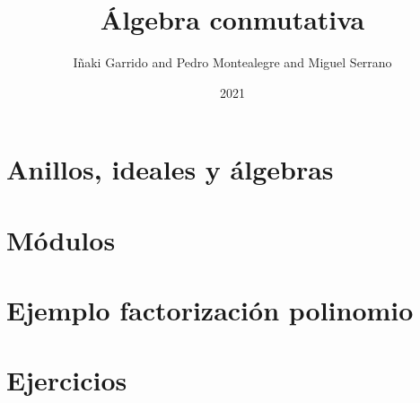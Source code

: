 \documentclass[a4paper,12pt]{book}
\title{Álgebra conmutativa}
\author{Iñaki Garrido and Pedro Montealegre and Miguel Serrano}
\date{2021}
\theoremstyle{definition}
\begin{document}
\maketitle
\chapter{Anillos, ideales y álgebras}

\chapter{Módulos}



\appendix
\chapter{Ejemplo factorización polinomio}

\chapter{Ejercicios}

\end{document}
